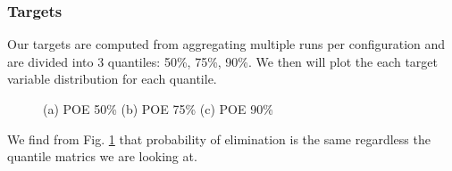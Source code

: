 \documentclass[12pt,letterpaper]{article}
\begin{document}
\subsubsection{Targets}
Our targets are computed from aggregating multiple runs per configuration
and are divided into 3 quantiles: 50\%, 75\%, 90\%. We then will plot the
each target variable distribution for each quantile.
\begin{figure}[h]
    \centering
    \hfil 
    \caption{(a) POE 50\% (b) POE 75\% (c) POE 90\%}
    \label{fig:target_histopoe}
\end{figure}

We find from Fig. \ref{fig:target_histopoe} that probability of elimination
is the same regardless the quantile matrics we are looking at.
\end{document}

